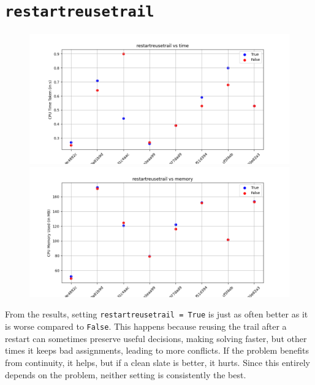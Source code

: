 \documentclass{article}
\begin{document}
    \section*{\texttt{restartreusetrail}}
    \begin{figure}[H]
        \centering
        \begin{minipage}{\textwidth}
            \centering
            \includegraphics[width = \linewidth]{restartreusetrail-0.png}
        \end{minipage}
        \hfill
        \begin{minipage}{\textwidth}
            \centering
            \includegraphics[width = \linewidth]{restartreusetrail-1.png}
        \end{minipage}
    \end{figure}
    From the results, setting \texttt{restartreusetrail = True} is just as
    often better as it is worse compared to \texttt{False}. This happens because
    reusing the trail after a restart can sometimes preserve useful decisions,
    making solving faster, but other times it keeps bad assignments, leading to
    more conflicts. If the problem benefits from continuity, it helps, but if a
    clean slate is better, it hurts. Since this entirely depends on the
    problem, neither setting is consistently the best.
\end{document}
